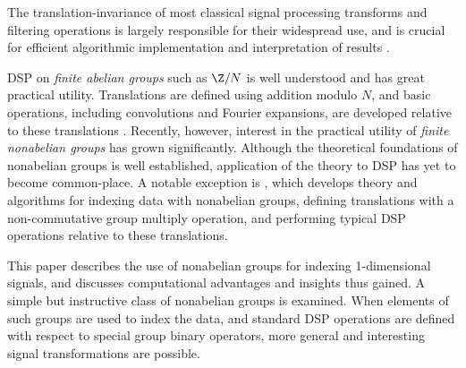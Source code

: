 
The translation-invariance of most classical signal
processing transforms and filtering operations is largely
responsible for their widespread use, and is crucial for
efficient algorithmic implementation and interpretation 
of results \cite{An:2003}. 

DSP on \emph{finite abelian groups} such as $\Z/N$ is
well understood and has great practical utility.  
Translations are defined using addition modulo $N$, and 
basic operations, including convolutions and Fourier 
expansions, are developed relative to these translations \cite{Tolimieri:1998}. 
Recently, however, interest in the practical utility of
\emph{finite nonabelian groups} has grown
significantly. Although the theoretical foundations of
nonabelian groups is well established, application of the
theory to DSP has yet to  become common-place.
A notable exception is \cite{An:2003},
which develops theory and algorithms for
indexing data with nonabelian groups, defining translations
with a non-commutative group multiply operation, and
performing typical DSP operations relative to these
translations. 

This paper describes the use of nonabelian groups
for indexing 1-dimensional signals, and discusses 
computational advantages and insights thus gained. 
A simple but instructive class of 
nonabelian groups 
is examined.  When elements of such
groups are used to index the data, and standard DSP
operations are defined with respect to special group
binary operators, more general and interesting
signal transformations are possible.

%